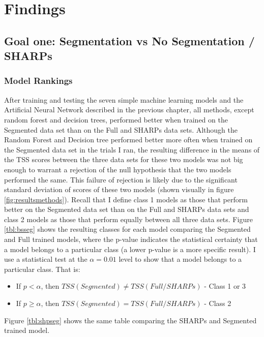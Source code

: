 \chapter{Findings}

\section{Goal one: Segmentation vs No Segmentation / SHARPs}
\subsection{Model Rankings}

After training and testing the seven simple machine learning models and the Artificial Neural Network described in the previous chapter, all methods, except random forest and decision trees, performed better when trained on the Segmented data set than on the Full and SHARPs data sets. Although the Random Forest and Decision tree performed better more often when trained on the Segmented data set in the trials I ran, the resulting difference in the means of the TSS scores between the three data sets for these two models was not big enough to warrant a rejection of the null hypothesis that the two models performed the same. This failure of rejection is likely due to the significant standard deviation of scores of these two models (shown visually in figure \ref{fig:resultsmethods}). Recall that I define class 1 models as those that perform better on the Segmented data set than on the Full and SHARPs data sets and class 2 models as those that perform equally between all three data sets. Figure \ref{tbl:bsseg} shows the resulting classes for each model comparing the Segmented and Full trained models, where the p-value indicates the statistical certainty that a model belongs to a particular class (a lower p-value is a more specific result). I use a statistical test at the $\alpha = 0.01$ level to show that a model belongs to a particular class. That is:

\begin{itemize}
    \item If $p < \alpha$, then $TSS(Segmented) \neq TSS(Full/SHARPs)$ - Class 1 or 3
    \item If $p \geq \alpha$, then $TSS(Segmented) = TSS(Full/SHARPs)$ - Class 2 
\end{itemize}

\noindent Figure \ref{tbl:shpseg} shows the same table comparing the SHARPs and Segmented trained model.

